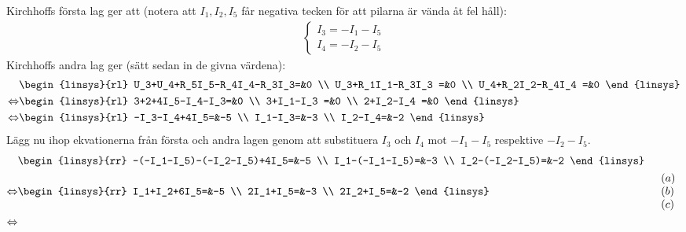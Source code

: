 \begin{task}{1.20}
	Kirchhoffs första lag ger att (notera att $I_1,I_2,I_5$ får negativa tecken för att pilarna är vända åt fel håll):
	\begin{align*}
		\begin{cases}
			I_3=-I_1-I_5 \\
			I_4=-I_2-I_5
		\end{cases}
	\end{align*}
	Kirchhoffs andra lag ger (sätt sedan in de givna värdena):
	\begin{align*}
		&\begin{linsys}{rl}
			U_3+U_4+R_5I_5-R_4I_4-R_3I_3=&0 \\
			U_3+R_1I_1-R_3I_3           =&0 \\
			U_4+R_2I_2-R_4I_4           =&0
		\end{linsys} \\ \lra
		&\begin{linsys}{rl}
			3+2+4I_5-I_4-I_3=&0 \\
			3+I_1-I_3       =&0 \\
			2+I_2-I_4       =&0
		\end{linsys} \\ \lra
		&\begin{linsys}{rl}
			-I_3-I_4+4I_5=&-5 \\
			I_1-I_3=&-3 \\
			I_2-I_4=&-2
		\end{linsys}
	\end{align*}
	Lägg nu ihop ekvationerna från första och andra lagen genom att substituera $I_3$ och $I_4$ mot $-I_1-I_5$ respektive $-I_2-I_5$.
	\begin{align*}
		&\begin{linsys}{rr}
			-(-I_1-I_5)-(-I_2-I_5)+4I_5=&-5 \\
			I_1-(-I_1-I_5)=&-3 \\
			I_2-(-I_2-I_5)=&-2 
		\end{linsys} \\ \lra
		&\begin{linsys}{rr}
			I_1+I_2+6I_5=&-5 \\
			2I_1+I_5=&-3 \\
			2I_2+I_5=&-2 
		\end{linsys}
		&\begin{array}{l}
			(a) \\
			(b) \\
			(c)
		\end{array} \\ \lra

\end{align*}
\end{task}
